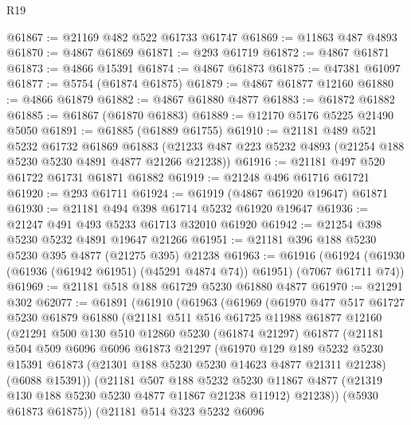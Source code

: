 \begin{lexlean}{R19}
\begin{coremodule}
@61867 := @21169 @482 @522 @61733 @61747
@61869 := @11863 @487 @4893
@61870 := @4867 @61869
@61871 := @293 @61719
@61872 := @4867 @61871
@61873 := @4866 @15391
@61874 := @4867 @61873
@61875 := @47381 @61097
@61877 := @5754 (@61874 @61875)
@61879 := @4867 @61877 @12160
@61880 := @4866 @61879
@61882 := @4867 @61880 @4877
@61883 := @61872 @61882
@61885 := @61867 (@61870 @61883)
@61889 := @12170 @5176 @5225 @21490 @5050
@61891 := @61885 (@61889 @61755)
@61910 := @21181
    @489
    @521
    @5232
    @61732
    @61869
    @61883
    (@21233 @487 @223 @5232 @4893 (@21254 @188 @5230 @5230 @4891 @4877 @21266 @21238))
@61916 := @21181 @497 @520 @61722 @61731 @61871 @61882
@61919 := @21248 @496 @61716 @61721
@61920 := @293 @61711
@61924 := @61919 (@4867 @61920 @19647) @61871
@61930 := @21181 @494 @398 @61714 @5232 @61920 @19647
@61936 := @21247 @491 @493 @5233 @61713 @32010 @61920
@61942 := @21254 @398 @5230 @5232 @4891 @19647 @21266
@61951 := @21181 @396 @188 @5230 @5230 @395 @4877 (@21275 @395) @21238
@61963 := @61916
    (@61924 (@61930 (@61936 (@61942 @61951) (@45291 @4874 @74)) @61951) (@7067 @61711 @74))
@61969 := @21181 @518 @188 @61729 @5230 @61880 @4877
@61970 := @21291 @302
@62077 := @61891
    (@61910
      (@61963
        (@61969
          (@61970
            @477
            @517
            @61727
            @5230
            @61879
            @61880
            (@21181
              @511
              @516
              @61725
              @11988
              @61877
              @12160
              (@21291
                @500
                @130
                @510
                @12860
                @5230
                (@61874 @21297)
                @61877
                (@21181
                  @504
                  @509
                  @6096
                  @6096
                  @61873
                  @21297
                  (@61970
                    @129
                    @189
                    @5232
                    @5230
                    @15391
                    @61873
                    (@21301 @188 @5230 @5230 @14623 @4877 @21311 @21238)
                    (@6088 @15391))
                  (@21181
                    @507
                    @188
                    @5232
                    @5230
                    @11867
                    @4877
                    (@21319 @130 @188 @5230 @5230 @4877 @11867 @21238 @11912)
                    @21238))
                (@5930 @61873 @61875))
              (@21181
                @514
                @323
                @5232
                @6096

\end{coremodule}
\end{lexlean}
